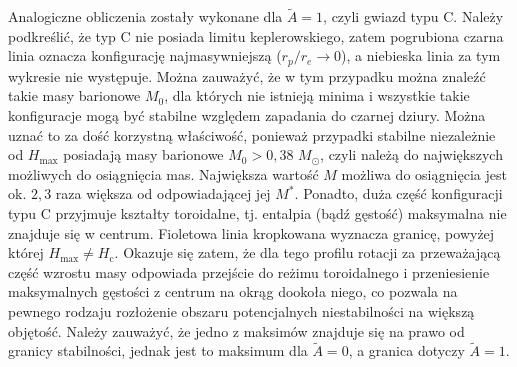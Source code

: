 \documentclass{bachelor_thesis}
\begin{document}
            \indent Analogiczne obliczenia zostały wykonane dla $\tilde{A}=1$, czyli gwiazd typu C. Należy podkreślić, że typ C nie posiada limitu keplerowskiego, zatem pogrubiona czarna linia oznacza konfigurację najmasywniejszą ($r_p/r_e\rightarrow 0$), a niebieska linia za tym wykresie nie występuje. Można zauważyć, że w tym przypadku można znaleźć takie masy barionowe $M_0$, dla których nie istnieją minima i wszystkie takie konfiguracje mogą być stabilne względem zapadania do czarnej dziury. Można uznać to za dość korzystną właściwość, ponieważ przypadki stabilne niezależnie od $H_\textrm{max}$ posiadają masy barionowe $M_0>0,38$ $M_\odot$, czyli należą do największych możliwych do osiągnięcia mas. Największa wartość $M$ możliwa do osiągnięcia jest ok. $2,3$ raza większa od odpowiadającej jej $M^*$. Ponadto, duża część konfiguracji typu C przyjmuje kształty toroidalne, tj. entalpia (bądź gęstość) maksymalna nie znajduje się w centrum. Fioletowa linia kropkowana wyznacza granicę, powyżej której $H_\textrm{max}\neq H_\textrm{c}$.  Okazuje się zatem, że dla tego profilu rotacji za przeważającą część wzrostu masy odpowiada przejście do reżimu toroidalnego i przeniesienie maksymalnych gęstości z centrum na okrąg dookoła niego, co pozwala na pewnego rodzaju rozłożenie obszaru potencjalnych niestabilności na większą objętość. Należy zauważyć, że jedno z maksimów znajduje się na prawo od granicy stabilności, jednak jest to maksimum dla $\tilde{A}=0$, a granica dotyczy $\tilde{A}=1$.
\end{document}
